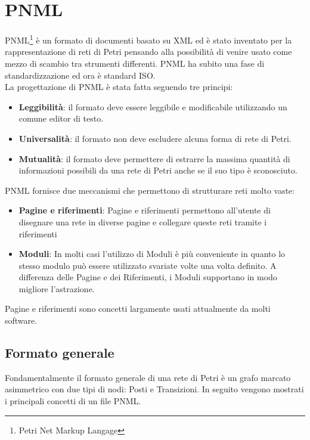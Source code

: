 \documentclass[italian,12pt]{book}
\begin{document}
\section{PNML}
PNML\footnote{Petri Net Markup Langage} è un formato di documenti basato su XML 
ed è stato inventato per la rappresentazione di reti di Petri pensando alla 
possibilità di venire usato come mezzo di scambio tra strumenti differenti. 
PNML ha subito una fase di standardizzazione ed ora è standard ISO.\\
La progettazione di PNML è stata fatta seguendo tre principi:
\begin{itemize}
\item {\bf Leggibilità}: il formato deve essere leggibile e
  modificabile utilizzando un comune editor di testo.
\item {\bf Universalità}: il formato non deve escludere alcuna forma
  di rete di Petri.
\item {\bf Mutualità}: il formato deve permettere di estrarre la
  massima quantità di informazioni possibili da una rete di Petri anche
  se il suo tipo è sconosciuto.
\end{itemize}
PNML fornisce due meccanismi che permettono di strutturare reti molto vaste:
\begin{itemize}
\item {\bf Pagine e riferimenti}: Pagine e riferimenti permettono
  all'utente di disegnare una rete in diverse pagine e collegare
  queste reti tramite i riferimenti
\item {\bf Moduli}: In molti casi l'utilizzo di Moduli è più
  conveniente in quanto lo stesso modulo può essere utilizzato
  svariate volte una volta definito. A differenza delle Pagine e
  dei Riferimenti, i Moduli supportano in modo migliore
  l'astrazione.
\end{itemize}
%
Pagine e riferimenti sono concetti largamente usati attualmente da
molti software.
\subsection{Formato generale}
Fondamentalmente il formato generale di una rete di Petri è un
grafo marcato asimmetrico con due tipi di nodi: Posti e
Transizioni. In seguito vengono mostrati i principali concetti di
un file PNML.
\end{document}
